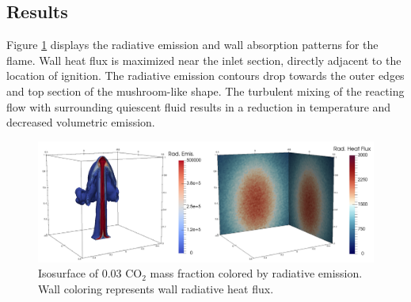 \subsection{Results}
Figure \ref{fig:PoolFire_radiationcontours} displays the radiative emission and wall absorption patterns for the flame. Wall heat flux is maximized near the inlet section, directly adjacent to the location of ignition. 
The radiative emission contours drop towards the outer edges and top section of the mushroom-like shape. The turbulent mixing of the reacting flow with surrounding quiescent fluid results in a reduction in temperature and decreased volumetric emission.  

\begin{figure}
\includegraphics[width=\linewidth]{figures/ch4/radiation_contours.png}
\caption{Isosurface of 0.03 CO$_2$ mass fraction colored by radiative emission. Wall coloring represents wall radiative heat flux.}
\label{fig:PoolFire_radiationcontours}
\end{figure}


